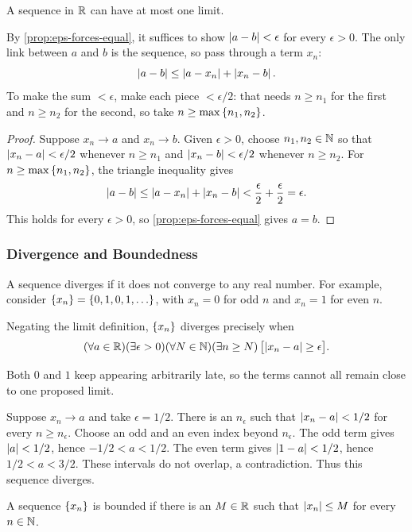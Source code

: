 \begin{theorem}\label{thm:limit-unique}
    A sequence in $\mathbb{R}$ can have at most one limit.
\end{theorem}
\begin{scratch}
    By \cref{prop:eps-forces-equal}, it suffices to show $\left|a-b\right|<\epsilon$ for every $\epsilon>0$. The only link between $a$ and $b$ is the sequence, so pass through a term $x_n$:
    \[
        \left|a-b\right|\leq\left|a-x_n\right|+\left|x_n-b\right|.
    \]
    To make the sum $<\epsilon$, make each piece $<\epsilon/2$: that needs $n\geq n_1$ for the first and $n\geq n_2$ for the second, so take $n\geq\max\left\{n_1,n_2\right\}$.
\end{scratch}
\begin{proof}
    Suppose $x_n\to a$ and $x_n\to b$. Given $\epsilon>0$, choose $n_1,n_2\in\mathbb{N}$ so that $\left|x_n-a\right|<\epsilon/2$ whenever $n\geq n_1$ and $\left|x_n-b\right|<\epsilon/2$ whenever $n\geq n_2$. For $n\geq\max\left\{n_1,n_2\right\}$, the triangle inequality gives
    \[
        \left|a-b\right|\leq\left|a-x_n\right|+\left|x_n-b\right|<\frac\epsilon2+\frac\epsilon2=\epsilon.
    \]
    This holds for every $\epsilon>0$, so \cref{prop:eps-forces-equal} gives $a=b$.
\end{proof}

\subsubsection{Divergence and Boundedness}
A sequence diverges if it does not converge to any real number. For example, consider $\left\{x_n\right\}=\left\{0,1,0,1,\ldots\right\}$, with $x_n=0$ for odd $n$ and $x_n=1$ for even $n$.

Negating the limit definition, $\left\{x_n\right\}$ diverges precisely when
\[
    (\forall a\in\mathbb{R})(\exists\epsilon>0)(\forall N\in\mathbb{N})(\exists n\geq N)\,\bigl[\left|x_n-a\right|\geq\epsilon\bigr].
\]

Both $0$ and $1$ keep appearing arbitrarily late, so the terms cannot all remain close to one proposed limit.

Suppose $x_n\to a$ and take $\epsilon=1/2$. There is an $n_\epsilon$ such that $\left|x_n-a\right|<1/2$ for every $n\geq n_\epsilon$. Choose an odd and an even index beyond $n_\epsilon$. The odd term gives $\left|a\right|<1/2$, hence $-1/2<a<1/2$. The even term gives $\left|1-a\right|<1/2$, hence $1/2<a<3/2$. These intervals do not overlap, a contradiction. Thus this sequence diverges.

\begin{definition}\label{def:bounded-sequence}
    A sequence $\left\{x_n\right\}$ is bounded if there is an $M\in\mathbb{R}$ such that $\left|x_n\right|\leq M$ for every $n\in\mathbb{N}$.
\end{definition}

